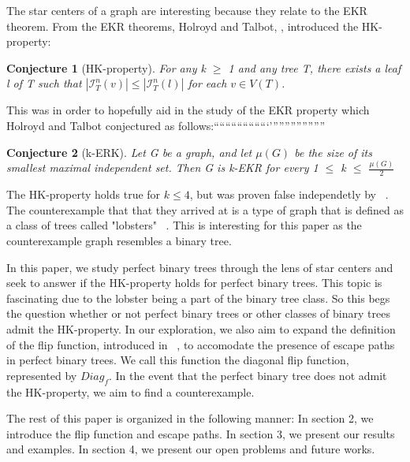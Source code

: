 \documentclass{amsart}
\newtheorem{conj}{Conjecture}[section]
\theoremstyle{definition}
\begin{document}
The star centers of a graph are interesting because they relate to the EKR theorem. From the EKR theorems, Holroyd and Talbot, \cite{MR2763040}, introduced the HK-property:

\begin{conj}[HK-property]
    For any k $\geq$ 1 and any tree T, there exists a leaf l of T such that $\left|\mathcal{I}^n_T(v)\right| \leq \left|\mathcal{I}^n_T(l)\right|$ for each $v \in V(T)$.
\end{conj}

This was in order to hopefully aid in the study of the EKR property which Holroyd and Talbot \cite{MR2136060} conjectured as follows:```````````````````'''''''''''''''''''

\begin{conj}[k-ERK]
    Let G be a graph, and let $\mu(G)$ be the size of its smallest maximal independent set. Then G is k-EKR for every 1 $\leq$ k $\leq$ $\frac{\mu(G)}{2}$
\end{conj}

The HK-property holds true for $k \leq 4$, but was proven false independetly by ~\cite{MR3271819, MR3612439, MR2523796}. The counterexample that that they arrived at is a type of graph that is defined as a class of trees called "lobsters" ~\cite{MR4245360}. This is interesting for this paper as the counterexample graph resembles a binary tree.

In this paper, we study perfect binary trees through the lens of star centers and seek to answer if the HK-property holds for perfect binary trees. This topic is fascinating due to the lobster being a part of the binary tree class. So this begs the question whether or not perfect binary trees or other classes of binary trees admit the HK-property. In our exploration, we also aim to expand the definition of the flip function, introduced in ~\cite{MR2763040}, to accomodate the presence of escape paths in perfect binary trees. We call this function the diagonal flip function, represented by $Diag_{f}$. In the event that the perfect binary tree does not admit the HK-property, we aim to find a counterexample.

The rest of this paper is organized in the following manner:
In section 2, we introduce the flip function and escape paths. In section 3, we present our results and examples. In section 4, we present our open problems and future works.

\end{document}
